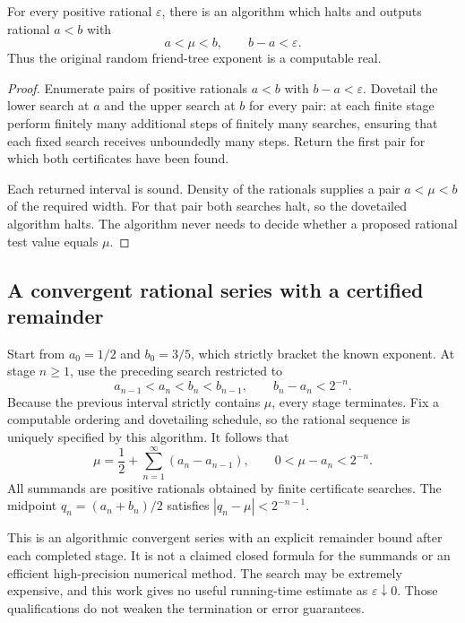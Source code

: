 \begin{theorem}\label{ecc:computable}
For every positive rational $\varepsilon$, there is an algorithm which
halts and outputs rational $a<b$ with
\[
 a<\mu<b,\qquad b-a<\varepsilon.
\]
Thus the original random friend-tree exponent is a computable real.
\end{theorem}
\begin{proof}
Enumerate pairs of positive rationals $a<b$ with $b-a<\varepsilon$.
Dovetail the lower search at $a$ and the upper search at $b$ for every
pair: at each finite stage perform finitely many additional steps of
finitely many searches, ensuring that each fixed search receives
unboundedly many steps.  Return the first pair for which both
certificates have been found.

Each returned interval is sound.  Density of the rationals supplies
a pair $a<\mu<b$ of the required width.  For that pair both searches
halt, so the dovetailed algorithm halts.  The algorithm never needs to
decide whether a proposed rational test value equals $\mu$.
\end{proof}

\subsection{A convergent rational series with a certified remainder}

Start from $a_0=1/2$ and $b_0=3/5$, which strictly bracket the known
exponent.  At stage $n\ge1$, use the preceding search restricted to
\[
 a_{n-1}<a_n<b_n<b_{n-1},\qquad b_n-a_n<2^{-n}.
\]
Because the previous interval strictly contains $\mu$, every stage
terminates.  Fix a computable ordering and dovetailing schedule, so
the rational sequence is uniquely specified by this algorithm.
It follows that
\begin{equation}\label{ecc:rational-series}
 \boxed{\displaystyle
 \mu=\frac12+\sum_{n=1}^{\infty}(a_n-a_{n-1}),\qquad
 0<\mu-a_n<2^{-n}.}
\end{equation}
All summands are positive rationals obtained by finite certificate
searches.  The midpoint $q_n=(a_n+b_n)/2$ satisfies
$|q_n-\mu|<2^{-n-1}$.

This is an algorithmic convergent series with an explicit remainder
bound after each completed stage.  It is not a claimed closed formula
for the summands or an efficient high-precision numerical method.
The search may be extremely expensive, and this work gives no useful
running-time estimate as $\varepsilon\downarrow0$.  Those qualifications
do not weaken the termination or error guarantees.

